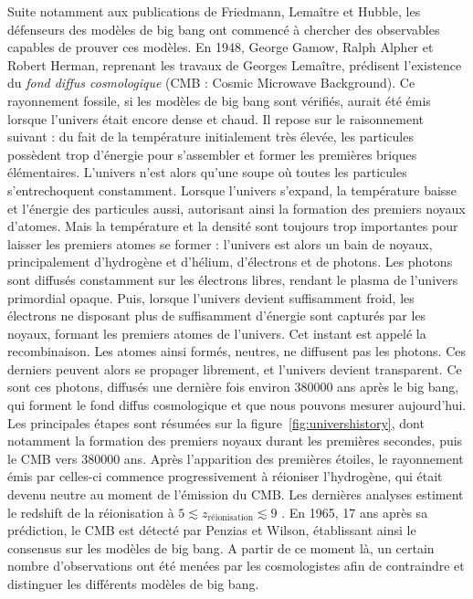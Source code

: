 Suite notamment aux publications de Friedmann, Lemaître et Hubble, les défenseurs des modèles de big bang ont commencé à chercher des observables capables de prouver ces modèles. En 1948, George Gamow, Ralph Alpher et Robert Herman, reprenant les travaux de Georges Lemaître, prédisent l'existence du \emph{fond diffus cosmologique} (CMB : Cosmic Microwave Background). Ce rayonnement fossile, si les modèles de big bang sont vérifiés, aurait été émis lorsque l'univers était encore dense et chaud. Il repose sur le raisonnement suivant : du fait de la température initialement très élevée, les particules possèdent trop d'énergie pour s'assembler et former les premières briques élémentaires. L'univers n'est alors qu'une soupe où toutes les particules s'entrechoquent constamment. Lorsque l'univers s'expand, la température baisse et l'énergie des particules aussi, autorisant ainsi la formation des premiers noyaux d'atomes. Mais la température et la densité sont toujours trop importantes pour laisser les premiers atomes se former : l'univers est alors un bain de noyaux, principalement d'hydrogène et d'hélium, d'électrons et de photons. Les photons sont diffusés constamment sur les électrons libres, rendant le plasma de l'univers primordial opaque. Puis, lorsque l'univers devient suffisamment froid, les électrons ne disposant plus de suffisamment d'énergie sont capturés par les noyaux, formant les premiers atomes de l'univers. Cet instant est appelé la recombinaison. Les atomes ainsi formés, neutres, ne diffusent pas les photons. Ces derniers peuvent alors se propager librement, et l'univers devient transparent. Ce sont ces photons, diffusés une dernière fois environ \num{380000} ans après le big bang, qui forment le fond diffus cosmologique et que nous pouvons mesurer aujourd'hui. Les principales étapes sont résumées sur la figure~\ref{fig:univershistory}, dont notamment la formation des premiers noyaux durant les premières secondes, puis le CMB vers \num{380000} ans.
Après l'apparition des premières étoiles, le rayonnement émis par celles-ci commence progressivement à réioniser l'hydrogène, qui était devenu neutre au moment de l'émission du CMB. Les dernières analyses estiment le redshift de la réionisation à $5 \lesssim z_{\mathrm{réionisation}} \lesssim 9$ \autocite{Collaboration2018}.
En 1965, 17 ans après sa prédiction, le CMB est détecté par Penzias et Wilson, établissant ainsi le consensus sur les modèles de big bang. A partir de ce moment là, un certain nombre d'observations ont été menées par les cosmologistes afin de contraindre et distinguer les différents modèles de big bang.
